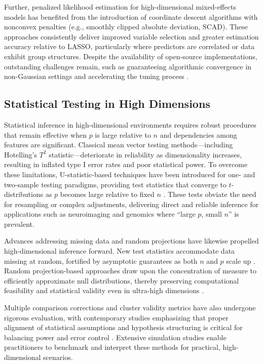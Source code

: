 Further, penalized likelihood estimation for high-dimensional mixed-effects models has benefited from the introduction of coordinate descent algorithms with nonconvex penalties (e.g., smoothly clipped absolute deviation, SCAD). These approaches consistently deliver improved variable selection and greater estimation accuracy relative to LASSO, particularly where predictors are correlated or data exhibit group structures. Despite the availability of open-source implementations, outstanding challenges remain, such as guaranteeing algorithmic convergence in non-Gaussian settings and accelerating the tuning process \cite{ref116}.

\subsection{Statistical Testing in High Dimensions}

Statistical inference in high-dimensional environments requires robust procedures that remain effective when $p$ is large relative to $n$ and dependencies among features are significant. Classical mean vector testing methods—including Hotelling’s $T^2$ statistic—deteriorate in reliability as dimensionality increases, resulting in inflated type I error rates and poor statistical power. To overcome these limitations, U-statistic-based techniques have been introduced for one- and two-sample testing paradigms, providing test statistics that converge to $t$-distributions as $p$ becomes large relative to fixed $n$ \cite{ref91}. These tests obviate the need for resampling or complex adjustments, delivering direct and reliable inference for applications such as neuroimaging and genomics where ``large $p$, small $n$'' is prevalent.

Advances addressing missing data and random projections have likewise propelled high-dimensional inference forward. New test statistics accommodate data missing at random, fortified by asymptotic guarantees as both $n$ and $p$ scale up \cite{ref94}. Random projection-based approaches draw upon the concentration of measure to efficiently approximate null distributions, thereby preserving computational feasibility and statistical validity even in ultra-high dimensions \cite{ref92,ref93}.

Multiple comparison corrections and cluster validity metrics have also undergone rigorous evaluation, with contemporary studies emphasizing that proper alignment of statistical assumptions and hypothesis structuring is critical for balancing power and error control \cite{ref95,ref110,ref113}. Extensive simulation studies enable practitioners to benchmark and interpret these methods for practical, high-dimensional scenarios.

